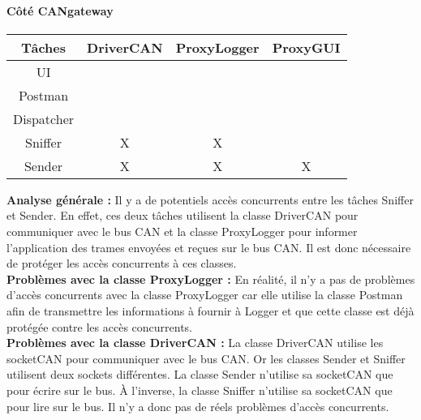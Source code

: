 \paragraph{Côté CANgateway}

\medspace

\begin{minipage}
    \textwidth
    \centering
    \begin{tabular}{|c|c|c|c|}
        \hline
        Tâches & DriverCAN & ProxyLogger & ProxyGUI\\
        \hline
        UI &  &  &\\
        \hline
        Postman &  &  & \\
        \hline
        Dispatcher &  &  & \\
        \hline
        Sniffer & X & X &  \\
        \hline
        Sender & X & X & X \\
        \hline
    \end{tabular}
\end{minipage}

\medspace

\textbf{Analyse générale :} Il y a de potentiels accès concurrents entre les tâches Sniffer et Sender. En effet, ces deux tâches utilisent la classe DriverCAN pour communiquer avec le bus CAN et la classe ProxyLogger pour informer l'application {\nomApplication} des trames envoyées et reçues sur le bus CAN. Il est donc nécessaire de protéger les accès concurrents à ces classes.\\

\textbf{Problèmes avec la classe ProxyLogger :} En réalité, il n'y a pas de problèmes d'accès concurrents avec la classe ProxyLogger car elle utilise la classe Postman afin de transmettre les informations à fournir à Logger et que cette classe est déjà protégée contre les accès concurrents.\\

\textbf{Problèmes avec la classe DriverCAN :} La classe DriverCAN utilise les socketCAN pour communiquer avec le bus CAN. Or les classes Sender et Sniffer utilisent deux sockets différentes. La classe Sender n'utilise sa socketCAN que pour écrire sur le bus. À l'inverse, la classe Sniffer n'utilise sa socketCAN que pour lire sur le bus. Il n'y a donc pas de réels problèmes d'accès concurrents.\\ 